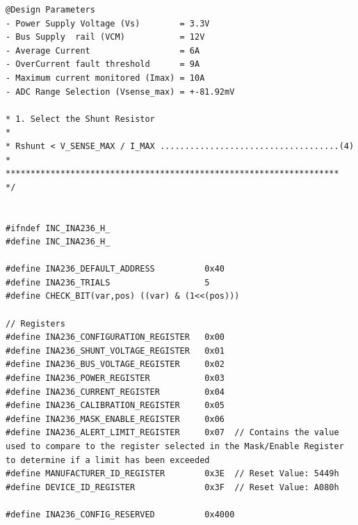 \documentclass[
10pt, %
a4paper, %
oneside, %
headinclude,footinclude, %
BCOR5mm, %
]{scrartcl}
\begin{document}
\begin{lstlisting}[firstnumber=1,style=CStyle]
@Design Parameters
- Power Supply Voltage (Vs)        = 3.3V
- Bus Supply  rail (VCM)           = 12V
- Average Current                  = 6A
- OverCurrent fault threshold      = 9A
- Maximum current monitored (Imax) = 10A
- ADC Range Selection (Vsense_max) = +-81.92mV 
 
* 1. Select the Shunt Resistor
* 
* Rshunt < V_SENSE_MAX / I_MAX ....................................(4)
* 
*******************************************************************
*/


#ifndef INC_INA236_H_
#define INC_INA236_H_

#define INA236_DEFAULT_ADDRESS          0x40
#define INA236_TRIALS                   5
#define CHECK_BIT(var,pos) ((var) & (1<<(pos)))

// Registers
#define INA236_CONFIGURATION_REGISTER   0x00
#define INA236_SHUNT_VOLTAGE_REGISTER   0x01
#define INA236_BUS_VOLTAGE_REGISTER     0x02
#define INA236_POWER_REGISTER           0x03
#define INA236_CURRENT_REGISTER         0x04
#define INA236_CALIBRATION_REGISTER     0x05
#define INA236_MASK_ENABLE_REGISTER     0x06
#define INA236_ALERT_LIMIT_REGISTER     0x07  // Contains the value used to compare to the register selected in the Mask/Enable Register to determine if a limit has been exceeded 
#define MANUFACTURER_ID_REGISTER        0x3E  // Reset Value: 5449h
#define DEVICE_ID_REGISTER              0x3F  // Reset Value: A080h

#define INA236_CONFIG_RESERVED          0x4000


\end{lstlisting}
\end{document}
